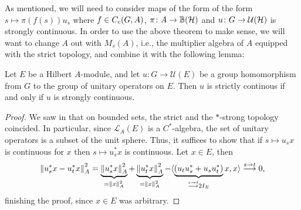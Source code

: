 As mentioned, we will need to consider maps of the form of the form $s \mapsto \pi(f(s)) u_s$ where $f \in C_c(G,A)$, $\pi\colon  A \to \mathbb{B}(\mathcal{H})$ and $u \colon G \to \mathcal{U}(\mathcal{H})$ is strongly continuous. In order to use the above theorem to make sense, we will want to change $A$ out with $M_s(A)$, i.e., the multiplier algebra of $A$ equipped with the strict topology, and combine it with the following lemma:
\begin{lemma}
Let $E$ be a Hilbert $A$-module, and let $u \colon G \to \mathcal{U}(E)$ be a group homomorphism from $G$ to the group of unitary operators on $E$. Then $u$ is strictly continous if and only if $u$ is strongly continuous.
\label{int:unistrictstrong}
\end{lemma}
\begin{proof}
We saw in  that on bounded sets, the strict and the $*$-strong topology coincided. In particular, since $\mathcal{L}_A(E)$ is a $C^*$-algebra, the set of unitary operators is a subset of the unit sphere. Thus, it suffices to show that if $s \mapsto u_s x$ is continuous for $x$ then $s \mapsto u_s^* x$ is continuous. Let $x \in E$, then
\begin{align*}
	\left\lVert u_s^* x - u_t^*x \right\rVert_A^2 = \underbrace{\left\lVert u_s^* x \right\rVert_A^2}_{= \left\lVert x \right\rVert_A^2} + \underbrace{\left\lVert u_t^*x \right\rVert_A^2}_{= \left\lVert x \right\rVert_A^2} - \langle \underbrace{ \left( u_t u_s^* + u_s u_t^*  \right)}_{\stackrel{s \to t}{\longrightarrow} 2I_E} x ,x \rangle \stackrel{s \to t}{\longrightarrow} 0,
\end{align*}
finishing the proof, since $x \in E$ was arbitrary.
\end{proof}


